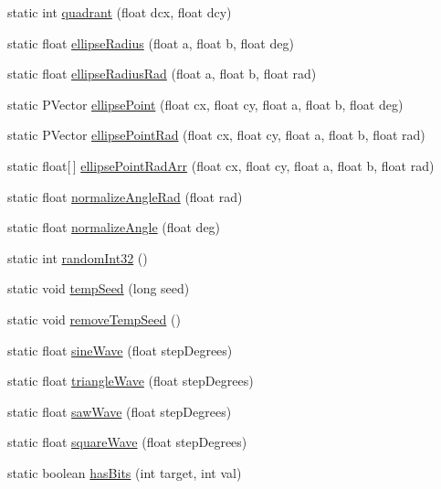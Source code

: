 \begin{DoxyCompactItemize}
\item 
static int \hyperlink{classhype_1_1util_1_1_h_math_a77d4c651da50c90d3b210082f3d7160a}{quadrant} (float dcx, float dcy)
\item 
static float \hyperlink{classhype_1_1util_1_1_h_math_acd2400df49f165585c7c5069032d3c30}{ellipse\-Radius} (float a, float b, float deg)
\item 
static float \hyperlink{classhype_1_1util_1_1_h_math_aeba1842b15edd56fa8cc628098cfb592}{ellipse\-Radius\-Rad} (float a, float b, float rad)
\item 
static P\-Vector \hyperlink{classhype_1_1util_1_1_h_math_a57230ddf5b0c28c1868a64904f3f19f7}{ellipse\-Point} (float cx, float cy, float a, float b, float deg)
\item 
static P\-Vector \hyperlink{classhype_1_1util_1_1_h_math_abb716f00b9b50fba0195e964bc976804}{ellipse\-Point\-Rad} (float cx, float cy, float a, float b, float rad)
\item 
static float\mbox{[}$\,$\mbox{]} \hyperlink{classhype_1_1util_1_1_h_math_a0ed7dff059ec1f5e67ed231e715f030d}{ellipse\-Point\-Rad\-Arr} (float cx, float cy, float a, float b, float rad)
\item 
static float \hyperlink{classhype_1_1util_1_1_h_math_ae4d6fb62a48211c091adad7ef17b17ac}{normalize\-Angle\-Rad} (float rad)
\item 
static float \hyperlink{classhype_1_1util_1_1_h_math_aa641b5124a8cc29ff96c589a3add2135}{normalize\-Angle} (float deg)
\item 
static int \hyperlink{classhype_1_1util_1_1_h_math_a0bbeefb9f57d4341c5059687ad528682}{random\-Int32} ()
\item 
static void \hyperlink{classhype_1_1util_1_1_h_math_aaa0f2ca11fbdaaa363c5c29ff1acf58b}{temp\-Seed} (long seed)
\item 
static void \hyperlink{classhype_1_1util_1_1_h_math_a6209cbef5f9754065c2a7cdc38b43665}{remove\-Temp\-Seed} ()
\item 
static float \hyperlink{classhype_1_1util_1_1_h_math_a70432ca80abf61919404cd778100304a}{sine\-Wave} (float step\-Degrees)
\item 
static float \hyperlink{classhype_1_1util_1_1_h_math_ad485c46a803bce9ecb67ffbc995e027a}{triangle\-Wave} (float step\-Degrees)
\item 
static float \hyperlink{classhype_1_1util_1_1_h_math_ae2cbf7905c5ec87a10ea532f2164f861}{saw\-Wave} (float step\-Degrees)
\item 
static float \hyperlink{classhype_1_1util_1_1_h_math_a8fd18e82bb54ba01f12b3b87d329ec5f}{square\-Wave} (float step\-Degrees)
\item 
static boolean \hyperlink{classhype_1_1util_1_1_h_math_af99cc1d7b58081d9f54187f49bfca833}{has\-Bits} (int target, int val)
\end{DoxyCompactItemize}
